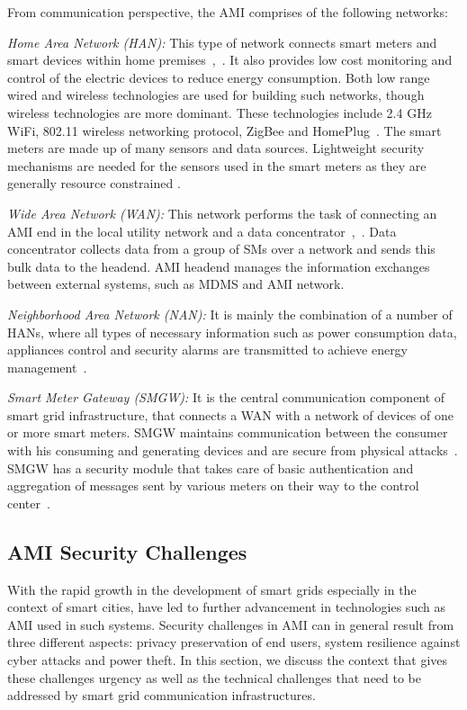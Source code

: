 \par From communication perspective, the AMI comprises of the following networks:

\textit{Home Area Network (HAN):} This type of network connects smart meters and smart devices within home premises~\cite{Wang11},~\cite{Jokar16}. It also provides low cost monitoring and control of the electric devices to reduce energy consumption. Both low range wired and wireless technologies are used for building such networks, though wireless technologies are more dominant. These technologies include 2.4 GHz WiFi, 802.11 wireless networking protocol, ZigBee and HomePlug~\cite{US_report1}. The smart meters are made up of many sensors and data sources. Lightweight security mechanisms are needed for the sensors used in the smart meters as they are generally resource constrained \cite{Taneja2013}.

\textit{Wide Area Network (WAN):} This network performs the task of connecting an AMI end in the local utility network and a data concentrator~\cite{Kuzlu17},~\cite{Chim15}. Data concentrator collects data from a group of SMs over a network and sends this bulk data to the headend. AMI headend manages the information exchanges between external systems, such as MDMS and AMI network.

\textit{Neighborhood Area Network (NAN):} It is mainly the combination of a number of HANs, where all types of necessary information such as power consumption data, appliances control and security alarms are transmitted to achieve energy management~\cite{Kuzlu17}.

\textit{Smart Meter Gateway (SMGW):} It is the central communication component of smart grid infrastructure, that connects a WAN with a network of devices of one or more smart meters. SMGW maintains communication between the consumer with his consuming and generating devices and are secure from physical attacks~\cite{Lunkeit013}. SMGW has a security module that takes care of basic authentication and aggregation of messages sent by various meters on their way to the control center~\cite{Sikora2013}. 
\subsection{AMI Security Challenges}

With the rapid growth in the development of smart grids especially in the context of smart cities, have led to further advancement in technologies such as AMI used in such systems. Security challenges in AMI can in general result from three different aspects: privacy preservation of end users, system resilience against cyber attacks and power theft. In this section, we discuss the context that gives these challenges urgency as well as the technical challenges that need to be addressed by smart grid
communication infrastructures. 

